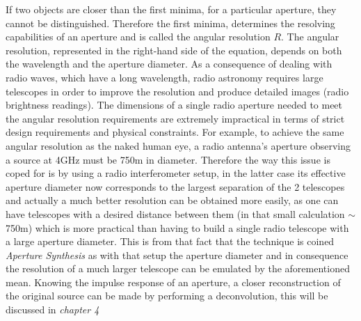 If two objects are closer than the first minima, for a particular
aperture, they cannot be distinguished. Therefore the first minima, determines the resolving
capabilities of an aperture and is called the angular resolution $R$. The angular
resolution, represented in the right-hand side of the equation, depends on both the wavelength
and the aperture diameter. As a consequence of dealing with radio waves, which have a long
wavelength, radio astronomy requires large telescopes in order to improve the resolution and
produce detailed images (radio brightness readings). The dimensions of a single radio aperture needed to meet the angular resolution requirements are extremely impractical in terms of strict design requirements and physical constraints. For example, to achieve the same angular resolution as the naked human eye, a radio antenna’s aperture observing a source at 4GHz must be 750m in diameter. Therefore the way this issue is coped for is by using a radio interferometer setup, in the latter case its effective aperture diameter now corresponds to the largest separation of the 2 telescopes and actually a much better resolution can be obtained more easily, as one can have telescopes with a desired distance between them (in that small calculation $\sim$ 750m) which is more practical than having to build a single radio telescope with a large aperture diameter. This is from that fact that the technique is coined \textit{Aperture Synthesis} as with that setup the aperture diameter and in consequence the resolution of a much larger telescope can be emulated by the aforementioned mean.  Knowing the impulse response of an aperture, a closer reconstruction of the original source can be made by performing a deconvolution, this will be discussed in \textit{chapter 4}
\newpage
